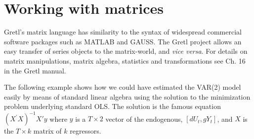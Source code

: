 \documentclass[11pt]{article}
\begin{document}
%


\section{Working with matrices}
Gretl's matrix language has similarity to the syntax of widespread commercial software packages such as MATLAB and GAUSS. The Gretl project allows an easy transfer of series objects to the matrix-world, and \textit{vice versa}. For details on matrix manipulations, matrix algebra, statistics and transformations see Ch. 16 in the Gretl manual.

The following example shows how we could have estimated the VAR(2) model easily by means of standard linear algebra using the solution to the minimization problem underlying standard OLS. The solution is the famous equation $ (X^\prime X)^{-1} X'y $ where $ y $  is a $ T \times 2 $ vector of the endogenous, $ [dU_t, gY_t] $, and $ X $ is the $ T \times k $ matrix of $ k $ regressors.
\end{document}
